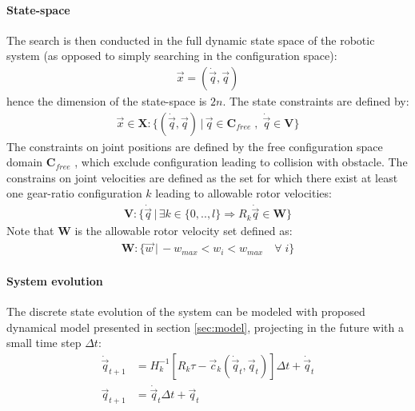 \paragraph{State-space}
%
The search is then conducted in the full dynamic state space of the robotic system (as opposed to simply searching in the configuration space):
%
\begin{align}
\vec{x} = \left( \dot{\vec{q}} , \vec{q} \right)
\end{align}
%
hence the dimension of the state-space is $2n$. The state constraints are defined by:
%
\begin{align}
\vec{x} \in \boldsymbol{X}: \big\{ \left( \dot{\vec{q}} , \vec{q} \right) \,|\,  \vec{q} \in \boldsymbol{C}_{free} \;,\; \dot{\vec{q}} \in \boldsymbol{V} \big\}
\end{align}
%
The constraints on joint positions are defined by the free configuration space domain $\boldsymbol{C}_{free}$ \cite{lozano-perez_algorithm_1979}, which exclude configuration leading to collision with obstacle. The constrains on joint velocities are defined as the set for which there exist at least one gear-ratio configuration $k$ leading to allowable rotor velocities:
%
\begin{align}
\boldsymbol{V} : \big\{ \dot{\vec{q}} \,|\, \exists k \in \{0,..,l\} \Rightarrow R_k \dot{\vec{q}} \in \boldsymbol{W} \big\}
\end{align}
%
Note that $\boldsymbol{W}$ is the allowable rotor velocity set defined as:
%
\begin{align}
\boldsymbol{W} : \big\{ \vec{w} \,|\,  -w_{max} < w_i < w_{max}  \quad \forall \; i \big\}
\end{align}
%

\paragraph{System evolution}
%
The discrete state evolution of the system can be modeled with proposed dynamical model presented in section \ref{sec:model}, projecting in the future with a small time step $\Delta t$:
%
\begin{align}
\dot{\vec{q}}_{t+1} &= H_k^{-1} \left[ R_k \tau - \vec{c}_k( \dot{\vec{q}}_t , \vec{q}_t ) \right] \Delta t + \dot{\vec{q}}_{t} \\
      \vec{q}_{t+1} &=  \dot{\vec{q}}_{t} \Delta t + \vec{q}_{t}
\end{align}
%
 
